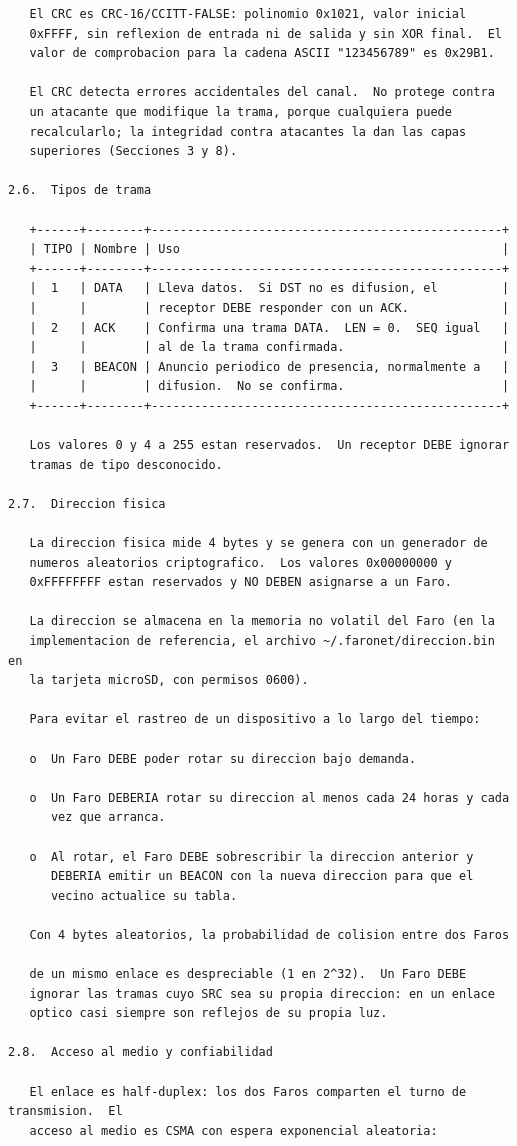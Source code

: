 \newpage
\begin{Verbatim}
   El CRC es CRC-16/CCITT-FALSE: polinomio 0x1021, valor inicial
   0xFFFF, sin reflexion de entrada ni de salida y sin XOR final.  El
   valor de comprobacion para la cadena ASCII "123456789" es 0x29B1.

   El CRC detecta errores accidentales del canal.  No protege contra
   un atacante que modifique la trama, porque cualquiera puede
   recalcularlo; la integridad contra atacantes la dan las capas
   superiores (Secciones 3 y 8).

2.6.  Tipos de trama

   +------+--------+-------------------------------------------------+
   | TIPO | Nombre | Uso                                             |
   +------+--------+-------------------------------------------------+
   |  1   | DATA   | Lleva datos.  Si DST no es difusion, el         |
   |      |        | receptor DEBE responder con un ACK.             |
   |  2   | ACK    | Confirma una trama DATA.  LEN = 0.  SEQ igual   |
   |      |        | al de la trama confirmada.                      |
   |  3   | BEACON | Anuncio periodico de presencia, normalmente a   |
   |      |        | difusion.  No se confirma.                      |
   +------+--------+-------------------------------------------------+

   Los valores 0 y 4 a 255 estan reservados.  Un receptor DEBE ignorar
   tramas de tipo desconocido.

2.7.  Direccion fisica

   La direccion fisica mide 4 bytes y se genera con un generador de
   numeros aleatorios criptografico.  Los valores 0x00000000 y
   0xFFFFFFFF estan reservados y NO DEBEN asignarse a un Faro.

   La direccion se almacena en la memoria no volatil del Faro (en la
   implementacion de referencia, el archivo ~/.faronet/direccion.bin en
   la tarjeta microSD, con permisos 0600).

   Para evitar el rastreo de un dispositivo a lo largo del tiempo:

   o  Un Faro DEBE poder rotar su direccion bajo demanda.

   o  Un Faro DEBERIA rotar su direccion al menos cada 24 horas y cada
      vez que arranca.

   o  Al rotar, el Faro DEBE sobrescribir la direccion anterior y
      DEBERIA emitir un BEACON con la nueva direccion para que el
      vecino actualice su tabla.

   Con 4 bytes aleatorios, la probabilidad de colision entre dos Faros

   de un mismo enlace es despreciable (1 en 2^32).  Un Faro DEBE
   ignorar las tramas cuyo SRC sea su propia direccion: en un enlace
   optico casi siempre son reflejos de su propia luz.

2.8.  Acceso al medio y confiabilidad

   El enlace es half-duplex: los dos Faros comparten el turno de transmision.  El
   acceso al medio es CSMA con espera exponencial aleatoria:
\end{Verbatim}
